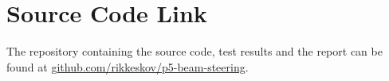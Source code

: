 \chapter{Source Code Link} \label{a:code}
The repository containing the source code, test results and the report can be found at \url{github.com/rikkeskov/p5-beam-steering}.